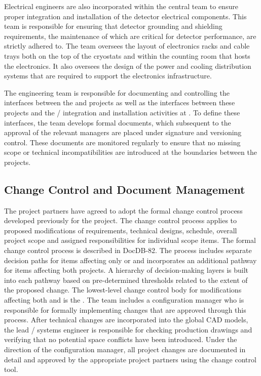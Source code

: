 Electrical engineers are also incorporated within the central
 team to ensure proper integration and installation 
of the detector electrical components.  This team is responsible 
for ensuring that detector grounding and shielding requirements, 
the maintenance of which are critical for detector performance, 
are strictly adhered to.  The team oversees the layout of 
electronics racks and cable trays both on the top of the cryostats 
and within the  counting room that hosts the  
electronics.  It also oversees the design of the power and cooling 
distribution systems that are required to support the electronics 
infrastructure.

The  engineering team is responsible for documenting and
controlling the interfaces between the  and  
projects as well as the interfaces between these projects and the 
/ integration and installation activities 
at .  To define these interfaces, the  team 
develops formal documents, which subsequent to the approval of the 
relevant managers are placed under signature and versioning control.  
These documents are monitored regularly to ensure that no missing 
scope or technical incompatibilities are introduced at the boundaries 
between the projects.

\subsection{Change Control and Document Management}
\label{sec:dune_changecontrol}

The  project partners have agreed to adopt 
the formal change control process developed previously for the 
 project.  The change control process applies to 
proposed modifications of requirements, technical designs, 
schedule, overall project scope and assigned responsibilities 
for individual scope items.  The formal  
change control process is described in DocDB-82.  The 
process includes separate decision paths for items affecting 
only  or  and incorporates an additional 
pathway for items affecting both projects.  A hierarchy of 
decision-making layers is built into each pathway based on 
pre-determined thresholds related to the extent of the proposed 
change.  The lowest-level change control body for modifications 
affecting both  and  is the .  
The  team includes a configuration manager who is 
responsible for formally implementing changes that are approved 
through this process.  After technical changes are incorporated 
into the global \threed CAD models, the lead / 
systems engineer is responsible for checking production drawings 
and verifying that no potential space conflicts have been 
introduced.  Under the direction of the configuration manager, 
all project changes are documented in detail and approved by 
the appropriate project partners using the  change 
control tool.

